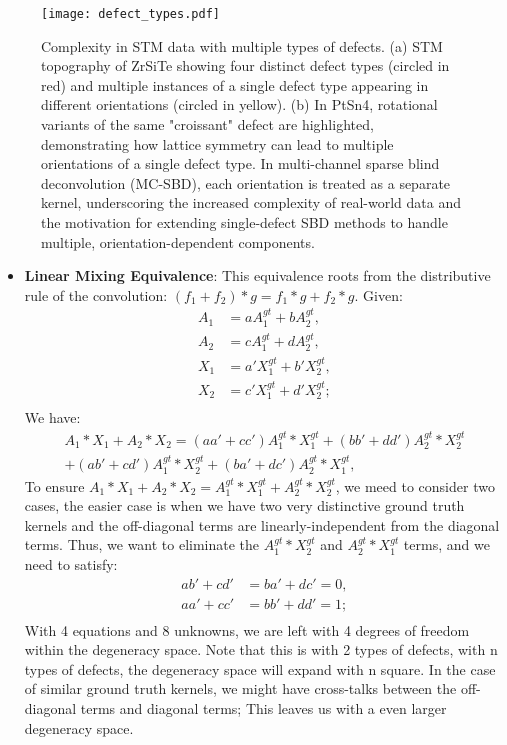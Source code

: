 \begin{figure}
	\texttt{[image: defect\_types.pdf]} 
	\centering
	\caption{Complexity in STM data with multiple types of defects. (a) STM topography of ZrSiTe showing four distinct defect types (circled in red) and multiple instances of a single defect type appearing in different orientations (circled in yellow). (b) In PtSn4, rotational variants of the same "croissant" defect are highlighted, demonstrating how lattice symmetry can lead to multiple orientations of a single defect type. In multi-channel sparse blind deconvolution (MC-SBD), each orientation is treated as a separate kernel, underscoring the increased complexity of real-world data and the motivation for extending single-defect SBD methods to handle multiple, orientation-dependent components.}
	\label{fig:ch6_defect}
\end{figure}

\begin{itemize}
	\item \textbf{Linear Mixing Equivalence}: This equivalence roots from the distributive rule of the convolution: $(f_1+f_2)*g = f_1*g + f_2*g$. Given: 
	\begin{align*}
		A_1 &= aA_1^{gt}+bA_2^{gt}, \\
		A_2 &= cA_1^{gt}+dA_2^{gt}, \\
		X_1 &= a'X_1^{gt}+b'X_2^{gt}, \\
		X_2 &= c'X_1^{gt}+d'X_2^{gt}; \\
	\end{align*}
	We have: 
	\begin{align*}
		A_1*X_1 +A_2*X_2= (aa'+cc') A_1^{gt}*X_1^{gt}+ (bb'+dd')A_2^{gt}*X_2^{gt} \\+ (ab'+cd') A_1^{gt}*X_2^{gt} +(ba'+dc') A_2^{gt}*X_1^{gt},
	\end{align*}
	To ensure $A_1*X_1 +A_2*X_2 = A_1^{gt}*X_1^{gt} + A_2^{gt}*X_2^{gt}$, we meed to consider two cases, the easier case is when we have two very distinctive ground truth kernels and the off-diagonal terms are linearly-independent from the diagonal terms. Thus, we want to eliminate the $A_1^{gt}*X_2^{gt}$ and $A_2^{gt}*X_1^{gt}$ terms, and we need to satisfy:
	 \begin{align*}
	 	ab'+cd'&= ba' + dc' = 0, \\
	 	aa'+cc'&= bb' + dd' = 1; \\
	 \end{align*}
	 With 4 equations and 8 unknowns, we are left with 4 degrees of freedom within the degeneracy space. Note that this is with 2 types of defects, with n types of defects, the degeneracy space will expand with n square. In the case of similar ground truth kernels, we might have cross-talks between the off-diagonal terms and diagonal terms; This leaves us with a even larger degeneracy space. 
\end{itemize}

